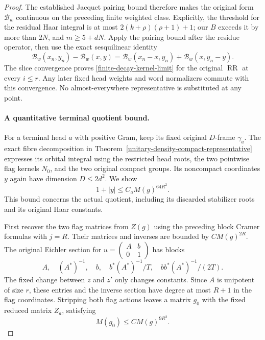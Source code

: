 \begin{proof}
The established Jacquet pairing bound therefore makes the original
form $\mathcal B_w$ continuous on the preceding finite weighted
class.  Explicitly, the threshold for the residual Haar integral
is at most $2(k+\rho)(\rho+1)+1$; our $B$ exceeds it by more
than $2N$, and $m\ge5+dN$.  Apply the pairing bound after the
residue operator, then use the exact sesquilinear identity
\[
 \mathcal B_w(x_n,y_n)-\mathcal B_w(x,y)
   =\mathcal B_w(x_n-x,y_n)+\mathcal B_w(x,y_n-y).
\]
The slice convergence proves \eqref{finite-decay-kernel-limit}
for the original $\operatorname{RR}$ at every $i\le r$.
Any later fixed head weights and word normalizers commute with
this convergence.  No almost-everywhere
representative is substituted at any point.

\paragraph{A quantitative terminal quotient bound.}
For a terminal head $a$ with positive Gram, keep its fixed original
$D$-frame $\gamma_a$.  The exact fibre decomposition in
Theorem~\ref{unitary-density-compact-representative} expresses
its orbital integral using the restricted head roots, the two
pointwise flag kernels $N_0$, and the two original compact groups.
Its noncompact coordinates $y$ again have dimension $D\le2d^2$.
We show
\begin{equation}\label{finite-decay-terminal-properness}
                         1+|y|\le C_a M(g)^{64R^2}.
\end{equation}
This bound concerns the actual quotient, including its discarded
stabilizer roots and its original Haar constants.

First recover the two flag matrices from $Z(g)$ using the preceding
block Cramer formulas with $j=R$.  Their matrices and inverses
are bounded by $C M(g)^{2R}$.  The original Eichler section for
$u=\left(\begin{smallmatrix}A&b\\0&1\end{smallmatrix}\right)$
has blocks
\[
             A,\quad (A^*)^{-1},\quad b,\quad
       b^*(A^*)^{-1}/T,\quad bb^*(A^*)^{-1}/(2T).
\]
The fixed change between $z$ and $z'$ only changes constants.
Since $A$ is unipotent of size $r$, these entries and the inverse
section have degree at most $R+1$ in the flag coordinates.
Stripping both flag actions leaves a matrix $g_0$ with the fixed
reduced matrix $Z_a$, satisfying
\[
                         M(g_0)\le C M(g)^{9R^2}.
\]


\end{proof}
